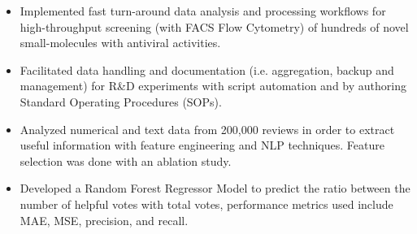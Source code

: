 \documentclass[10pt,a4paper]{altacv}
\begin{document}


\begin{itemize}
    \item   \small{Implemented fast turn-around data analysis and processing workflows for high-throughput screening (with FACS Flow Cytometry) of hundreds of novel small-molecules with antiviral activities.}
    \item   \small{Facilitated data handling and documentation (i.e. aggregation, backup and management) for R\&D experiments with script automation and by authoring Standard Operating Procedures (SOPs).}
    
\end{itemize}

\medskip







\begin{itemize}
  \item \small Analyzed numerical and text data from 200,000 reviews in order to extract useful information with feature engineering and NLP techniques. Feature selection was done with an ablation study. 
    \item \small Developed a Random Forest Regressor Model to predict the ratio between the number of helpful votes with total votes, performance metrics used include MAE, MSE, precision, and recall. 
\end{itemize}
\end{document}
